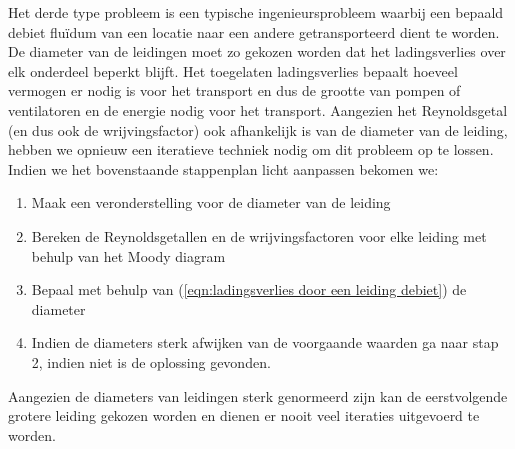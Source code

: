 Het derde type probleem is een typische ingenieursprobleem waarbij een bepaald debiet fluïdum van een locatie naar een andere getransporteerd dient te worden. De diameter van de leidingen moet zo gekozen worden dat het ladingsverlies over elk onderdeel beperkt blijft. Het toegelaten ladingsverlies bepaalt hoeveel vermogen er nodig is voor het transport en dus de grootte van pompen of ventilatoren en de energie nodig voor het transport. Aangezien het Reynoldsgetal (en dus ook de wrijvingsfactor) ook afhankelijk is van de diameter van de leiding, hebben we opnieuw een iteratieve techniek nodig om dit probleem op te lossen. Indien we het bovenstaande stappenplan licht aanpassen bekomen we:
\begin{enumerate}
	\item Maak een veronderstelling voor de diameter van de leiding
	\item Bereken de Reynoldsgetallen en de wrijvingsfactoren voor elke leiding met behulp van het Moody diagram
	\item Bepaal met behulp van (\ref{eqn:ladingsverlies door een leiding debiet}) de diameter
	\item Indien de diameters sterk afwijken van de voorgaande waarden ga naar stap 2, indien niet is de oplossing gevonden.
\end{enumerate}
Aangezien de diameters van leidingen sterk genormeerd zijn kan de eerstvolgende grotere leiding gekozen worden en dienen er nooit veel iteraties uitgevoerd te worden.

